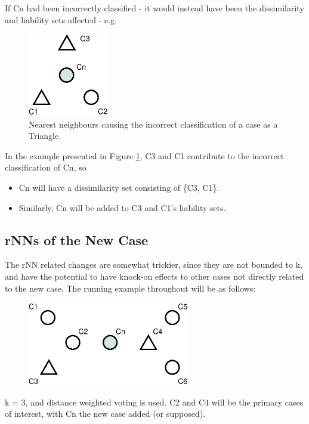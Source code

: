 \documentclass[a4paper,11pt]{report}
\begin{document}
If Cn had been incorrectly classified - it would instead have been the dissimilarity and liability sets affected - e.g.

\begin{figure}[h!]
  \centering
	\includegraphics[width=100pt]{./Drawn/NNsIncorrectlyClassify}
\caption{Nearest neighbours causing the incorrect classification of a case as a Triangle.}
\label{fig:nnsincorrectlyclassify}
\end{figure}

In the example presented in Figure \ref{fig:nnsincorrectlyclassify}, C3 and C1 contribute to the incorrect classification of Cn, so
\begin{itemize}
	\item Cn will have a dissimilarity set consisting of \{C3, C1\}.
	\item Similarly, Cn will be added to C3 and C1's liability sets.
\end{itemize}

\subsection{rNNs of the New Case}
The rNN related changes are somewhat trickier, since they are not bounded to k, and have the potential to have knock-on effects to other cases not directly related to the new case.
The running example throughout will be as follows:

\begin{figure}[h!] 
\centering
\includegraphics[width=200pt]{./Drawn/rNNExample}
\end{figure}

k = 3, and distance weighted voting is used. C2 and C4 will be the primary cases of interest, with Cn the new case added (or supposed).
\end{document}
